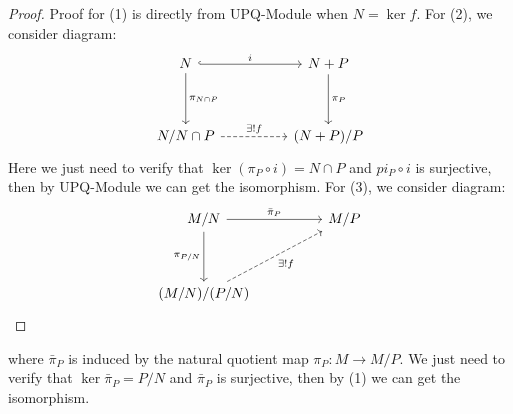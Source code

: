 \documentclass[12pt,a4paper]{article}
\begin{document}
\begin{proof}
    Proof for (1) is directly from UPQ-Module when \(N=\ker f\). For (2), we consider diagram:
\[\begin{tikzcd}
	N && {N+P} \\
	\\
	{N/{N \cap P}} && {(N+P)/P}
	\arrow["i", hook, from=1-1, to=1-3]
	\arrow["{\pi_{N\cap P}}", from=1-1, to=3-1]
	\arrow["{\pi_{P}}", from=1-3, to=3-3]
	\arrow["{\exists! f}", dashed, from=3-1, to=3-3]
\end{tikzcd}\]
Here we just need to verify that \(\ker(\pi_P \circ i) = N\cap P\) and \(pi_P \circ i\) is surjective, then by UPQ-Module we can get the isomorphism. For (3), we consider diagram:
\[\begin{tikzcd}
	{M/N} && {M/P} \\
	\\
	{(M/N)/(P/N)}
	\arrow["{\bar\pi_P}", from=1-1, to=1-3]
	\arrow["{\pi_{P/N}}"', from=1-1, to=3-1]
	\arrow["{\exists! f }"', dashed, from=3-1, to=1-3]
\end{tikzcd}\]
\end{proof}
where \(\bar{\pi}_P\) is induced by the natural quotient map \(\pi_P: M \to M/P\). We just need to verify that \(\ker \bar{\pi}_P = P/N\) and \(\bar{\pi}_P\) is surjective, then by (1) we can get the isomorphism.\\
\end{document}
